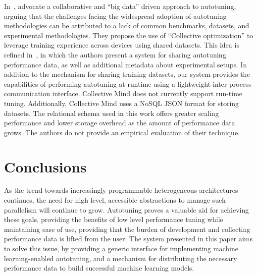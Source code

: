 \documentclass[nonatbib,preprint,9pt]{sigplanconf}
\begin{document}
In~\cite{Saclay2010,Memon2013}, \citeauthor{Saclay2010} advocate a
collaborative and ``big data'' driven approach to autotuning, arguing
that the challenges facing the widespread adoption of autotuning
methodologies can be attributed to a lack of common benchmarks,
datasets, and experimental methodologies. They propose the use of
``Collective optimization'' to leverage training experience across
devices using shared datasets. This idea is refined
in~\cite{Fursin2014}, in which the authors present a system for
sharing autotuning performance data, as well as additional metadata
about experimental setups. In addition to the mechanism for sharing
training datasets, our system provides the capabilities of performing
autotuning at runtime using a lightweight inter-process communication
interface. Collective Mind does not currently support run-time tuning.
Additionally, Collective Mind uses a NoSQL JSON format for storing
datasets. The relational schema used in this work offers greater
scaling performance and lower storage overhead as the amount of
performance data grows.  The authors do not provide an empirical
evaluation of their technique.


\section{Conclusions}\label{sec:conclusions}

As the trend towards increasingly programmable heterogeneous
architectures continues, the need for high level, accessible
abstractions to manage such parallelism will continue to
grow. Autotuning proves a valuable aid for achieving these goals,
providing the benefits of low level performance tuning while
maintaining ease of use, providing that the burden of development and
collecting performance data is lifted from the user. The system
presented in this paper aims to solve this issue, by
providing a
generic interface for implementing machine learning-enabled
autotuning, and a mechanism for distributing the necessary performance
data to build successful machine learning models.
\end{document}
